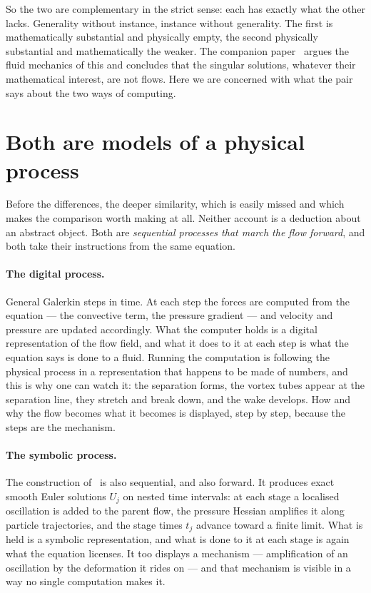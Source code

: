 \documentclass[11pt]{article}
\begin{document}
So the two are complementary in the strict sense: each has exactly what the other lacks. Generality
without instance, instance without generality. The first is mathematically substantial and
physically empty, the second physically substantial and mathematically the weaker. The companion
paper~\cite{euler} argues the fluid mechanics of this and concludes that the singular solutions,
whatever their mathematical interest, are not flows. Here we are concerned with what the pair says
about the two ways of computing.

\section{Both are models of a physical process}\label{sec:models}

Before the differences, the deeper similarity, which is easily missed and which makes the comparison
worth making at all. Neither account is a deduction about an abstract object. Both are
\emph{sequential processes that march the flow forward}, and both take their instructions from the
same equation.

\paragraph{The digital process.} General Galerkin steps in time. At each step the forces are computed
from the equation --- the convective term, the pressure gradient --- and velocity and pressure are
updated accordingly. What the computer holds is a digital representation of the flow field, and what
it does to it at each step is what the equation says is done to a fluid. Running the computation is
following the physical process in a representation that happens to be made of numbers, and this is
why one can watch it: the separation forms, the vortex tubes appear at the separation line, they
stretch and break down, and the wake develops. How and why the flow becomes what it becomes is
displayed, step by step, because the steps are the mechanism.

\paragraph{The symbolic process.} The construction of~\cite{openaieuler} is also sequential, and also
forward. It produces exact smooth Euler solutions $U_j$ on nested time intervals: at each stage a
localised oscillation is added to the parent flow, the pressure Hessian amplifies it along particle
trajectories, and the stage times $t_j$ advance toward a finite limit. What is held is a symbolic
representation, and what is done to it at each stage is again what the equation licenses. It too
displays a mechanism --- amplification of an oscillation by the deformation it rides on --- and that
mechanism is visible in a way no single computation makes it.
\end{document}

